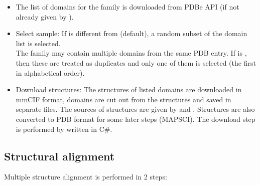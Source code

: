 \documentclass{article}
\begin{document}
\begin{itemize}
  \item
    The list of domains for the family is downloaded from PDBe API
    (if not already given by ).
  \item
    Select sample: If  is different from
     (default), a random subset of the domain list is selected.\\
    The family may contain multiple domains from the same PDB entry. If
     is , then
    these are treated as duplicates and only one of them is selected (the
    first in alphabetical order).
  \item
    Download structures: The structures of listed domains are downloaded
    in mmCIF format, domains are cut out from the structures and saved in
    separate files. The sources of structures are given by
     and
    . Structures are also
    converted to PDB format for some later steps (MAPSCI). The download
    step is performed by  written in C\#.
  \end{itemize}
  


\subsection{Structural alignment}

Multiple structure alignment is performed in 2 steps:
\end{document}
